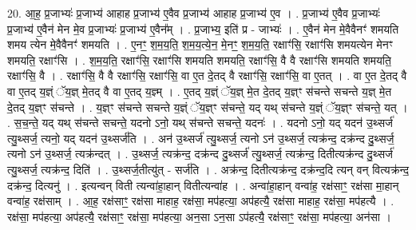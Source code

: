 \documentclass[17pt]{extarticle}
\begin{document}
20. आ॒ह॒ प्र॒जाभ्यः॑ प्र॒जाभ्य॑ आहाह प्र॒जाभ्य॑ ए॒वैव प्र॒जाभ्य॑ आहाह प्र॒जाभ्य॑ ए॒व । . प्र॒जाभ्य॑ ए॒वैव प्र॒जाभ्यः॑ प्र॒जाभ्य॑ ए॒वैन॑ मेन मे॒व प्र॒जाभ्यः॑ प्र॒जाभ्य॑ ए॒वैन᳚म् । . प्र॒जाभ्य॒ इति॑ प्र - जाभ्यः॑ । . ए॒वैन॑ मेन मे॒वैवैनꣳ॑ शमयति शमय त्येन मे॒वैवैनꣳ॑ शमयति । . ए॒नꣳ॒॒ श॒म॒य॒ति॒ श॒म॒य॒त्ये॒न॒ मे॒नꣳ॒॒ श॒म॒य॒ति॒ रक्षाꣳ॑सि॒ रक्षाꣳ॑सि शमयत्येन मेनꣳ शमयति॒ रक्षाꣳ॑सि । . श॒म॒य॒ति॒ रक्षाꣳ॑सि॒ रक्षाꣳ॑सि शमयति शमयति॒ रक्षाꣳ॑सि॒ वै वै रक्षाꣳ॑सि शमयति शमयति॒ रक्षाꣳ॑सि॒ वै । . रक्षाꣳ॑सि॒ वै वै रक्षाꣳ॑सि॒ रक्षाꣳ॑सि॒ वा ए॒त दे॒तद् वै रक्षाꣳ॑सि॒ रक्षाꣳ॑सि॒ वा ए॒तत् । . वा ए॒त दे॒तद् वै वा ए॒तद् य॒ज्ञ्ं ॅय॒ज्ञ् मे॒तद् वै वा ए॒तद् य॒ज्ञ्म् । . ए॒तद् य॒ज्ञ्ं ॅय॒ज्ञ् मे॒त दे॒तद् य॒ज्ञ्ꣳ स॑चन्ते सचन्ते य॒ज्ञ् मे॒त दे॒तद् य॒ज्ञ्ꣳ स॑चन्ते । . य॒ज्ञ्ꣳ स॑चन्ते सचन्ते य॒ज्ञ्ं ॅय॒ज्ञ्ꣳ स॑चन्ते॒ यद् यथ् स॑चन्ते य॒ज्ञ्ं ॅय॒ज्ञ्ꣳ स॑चन्ते॒ यत् । . स॒च॒न्ते॒ यद् यथ् स॑चन्ते सचन्ते॒ यदनो ऽनो॒ यथ् स॑चन्ते सचन्ते॒ यदनः॑ । . यदनो ऽनो॒ यद् यदन॑ उ॒थ्सर्ज॑ त्यु॒थ्सर्ज॒ त्यनो॒ यद् यदन॑ उ॒थ्सर्ज॑ति । . अन॑ उ॒थ्सर्ज॑ त्यु॒थ्सर्ज॒ त्यनो ऽन॑ उ॒थ्सर्ज॒ त्यक्र॑न्द॒ दक्र॑न्द दु॒थ्सर्ज॒ त्यनो ऽन॑ उ॒थ्सर्ज॒ त्यक्र॑न्दत् । . उ॒थ्सर्ज॒ त्यक्र॑न्द॒ दक्र॑न्द दु॒थ्सर्ज॑ त्यु॒थ्सर्ज॒ त्यक्र॑न्द॒ दितीत्यक्र॑न्द दु॒थ्सर्ज॑ त्यु॒थ्सर्ज॒ त्यक्र॑न्द॒ दिति॑ । . उ॒थ्सर्ज॒तीत्यु॑त् - सर्ज॑ति । . अक्र॑न्द॒ दितीत्यक्र॑न्द॒ दक्र॑न्द॒दि त्यन् वन् वित्यक्र॑न्द॒ दक्र॑न्द॒ दित्यनु॑ । . इत्यन्वन् विती त्यन्वा॑हा॒हान् वितीत्यन्वा॑ह । . अन्वा॑हा॒हान् वन्वा॑ह॒ रक्ष॑साꣳ॒॒ रक्ष॑सा मा॒हान् वन्वा॑ह॒ रक्ष॑साम् । . आ॒ह॒ रक्ष॑साꣳ॒॒ रक्ष॑सा माहाह॒ रक्ष॑सा॒ मप॑हत्या॒ अप॑हत्यै॒ रक्ष॑सा माहाह॒ रक्ष॑सा॒ मप॑हत्यै । . रक्ष॑सा॒ मप॑हत्या॒ अप॑हत्यै॒ रक्ष॑साꣳ॒॒ रक्ष॑सा॒ मप॑हत्या॒ अन॒सा ऽन॒सा ऽप॑हत्यै॒ रक्ष॑साꣳ॒॒ रक्ष॑सा॒ मप॑हत्या॒ अन॑सा । \newline
\end{document}
